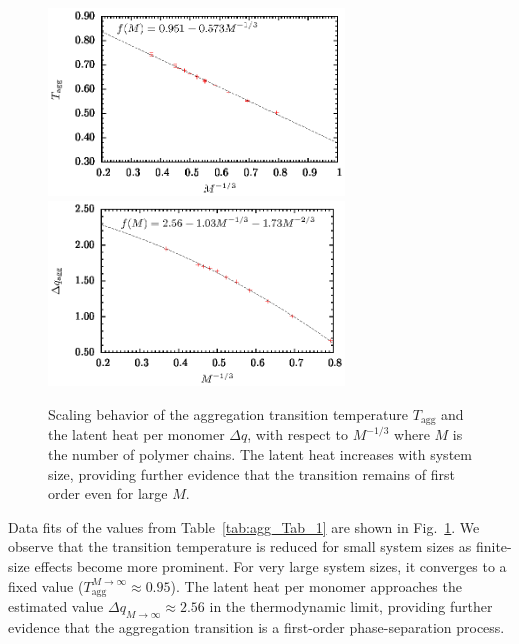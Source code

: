 \documentclass[12pt]{report}
\begin{document}
%
\begin{figure}
\center
\includegraphics[width = 0.7\textwidth]{chapter7Figs/scaling_beta.eps}
\includegraphics[width = 0.7\textwidth]{chapter7Figs/scaling_q.eps}
\caption{\label{fig:agg_scaling}%
Scaling behavior of the aggregation transition temperature $T_{\mathrm{agg}}$ and the latent heat per monomer $\Delta q$, with respect to $M^{-1/3}$ where $M$ is the number of polymer chains. The latent heat increases with system size, providing further evidence that the transition remains of first order even for large $M$. }
\end{figure}
%
\newpage

%
Data fits of the values from Table~\ref{tab:agg_Tab_1} are shown in Fig.~\ref{fig:agg_scaling}. We observe that the transition temperature is reduced for small system sizes as finite-size effects become more prominent. For very large system sizes, it converges to a fixed value ($T_\mathrm{agg}^{M\to \infty}\approx 0.95$). The latent heat per monomer approaches the estimated value $\Delta q_{M\to \infty}\approx 2.56$ in the thermodynamic limit, providing further evidence that the aggregation transition is a first-order phase-separation process.
%

\end{document}
